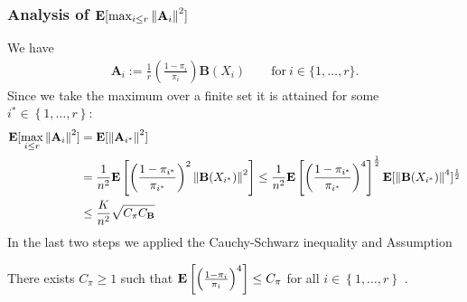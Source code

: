 \subsubsection*{
  Analysis of 
  $
  \mathbf{E}[\max_{i \le r}\left\lVert\mathbf{A}_i\right\rVert^2]
  $
}
We have
\begin{gather}
  \mathbf{A}_i
  :=
  \frac{1}{r}
  \left( 
    \frac{1-\pi_i}{\pi_i}
  \right)
  \mathbf{B}(X_i)
  \qquad
  \text{for}
  \ 
  i\in \{1, \ldots, r\}.
\end{gather}
Since we take the maximum over a finite set it is attained for some 
$i^*\in \left\{ 1, \ldots, r \right\}$:
\begin{align}
  \begin{split}
  \mathbf{E}[\max_{i \le r}\left\lVert\mathbf{A}_i\right\rVert^2]
  &=
  \mathbf{E}[\left\lVert\mathbf{A}_{i^*}\right\rVert^2]
  \\
  &=
  \frac{1}{n^2}
  \mathbf{E} \left[ 
    \left(
      \frac{1-\pi_{i^*}}{\pi_{i^*}}
    \right)^2
    \left\lVert\mathbf{B}(X_{i^*})\right\rVert^2
  \right]
  \le
  \frac{1}{n^2}
  \mathbf{E} \left[ 
    \left(
      \frac{1-\pi_{i^*}}{\pi_{i^*}}
    \right)^4
  \right]^\frac{1}{2}
  \mathbf{E}[
    \left\lVert\mathbf{B}(X_{i^*})\right\rVert^4
  ]^\frac{1}{2}
  \\
  &\le
  \frac{K}{n^2}\sqrt{C_\pi C_\mathbf{B}}
\end{split}
\end{align}
In the last two steps we applied the Cauchy-Schwarz inequality
and Assumption
\begin{assumption}
  There exists $C_\pi \ge 1$ such that
  $
    \mathbf{E}
    \left[ 
    \left(
      \frac{1-\pi_{i}}{\pi_{i}}
    \right)^4
    \right]
    \le C_\pi
  $
  for all $i\in \left\{ 1, \ldots, r \right\}$
  .
\end{assumption}
 
